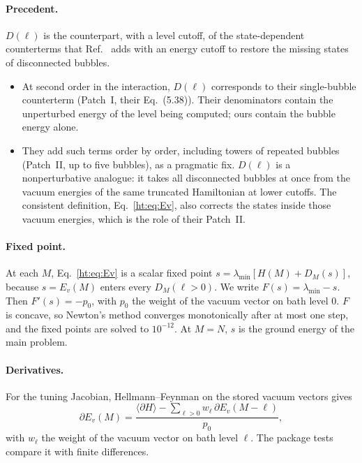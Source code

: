 \paragraph{Precedent.} $D(\ell)$ is the counterpart, with a level cutoff, of the state-dependent counterterms that
Ref.~\cite{ht:Elias-Miro:2020qwz} adds with an energy cutoff to restore the missing states of disconnected bubbles.
\begin{itemize}
\item At second order in the interaction, $D(\ell)$ corresponds to their single-bubble counterterm (Patch~I, their
 Eq.~(5.38)). Their denominators contain the unperturbed energy of the level being computed; ours contain the bubble
 energy alone.
\item They add such terms order by order, including towers of repeated bubbles (Patch~II, up to five bubbles), as a
 pragmatic fix. $D(\ell)$ is a nonperturbative analogue: it takes all disconnected bubbles at once from the vacuum
 energies of the same truncated Hamiltonian at lower cutoffs. The consistent definition, Eq.~\eqref{ht:eq:Ev}, also
 corrects the states inside those vacuum energies, which is the role of their Patch~II.
\end{itemize}

\paragraph{Fixed point.} At each $M$, Eq.~\eqref{ht:eq:Ev} is a scalar fixed point $s=\lambda_{\min}[H(M)+D_M(s)]$,
because $s=E_v(M)$ enters every $D_M(\ell>0)$. We write $F(s)=\lambda_{\min}-s$. Then $F'(s)=-p_0$, with $p_0$ the
weight of the vacuum vector on bath level 0. $F$ is concave, so Newton's method converges monotonically after at most
one step, and the fixed points are solved to $10^{-12}$. At $M=N$, $s$ is the ground energy of the main problem.

\paragraph{Derivatives.} For the tuning Jacobian, Hellmann--Feynman on the stored vacuum vectors gives
\begin{equation}
 \partial E_v(M)=\frac{\langle\partial H\rangle-\sum_{\ell>0}w_\ell\,\partial E_v(M-\ell)}{p_0},
 \label{ht:eq:dEv}
\end{equation}
with $w_\ell$ the weight of the vacuum vector on bath level $\ell$. The package tests compare it with finite differences.

